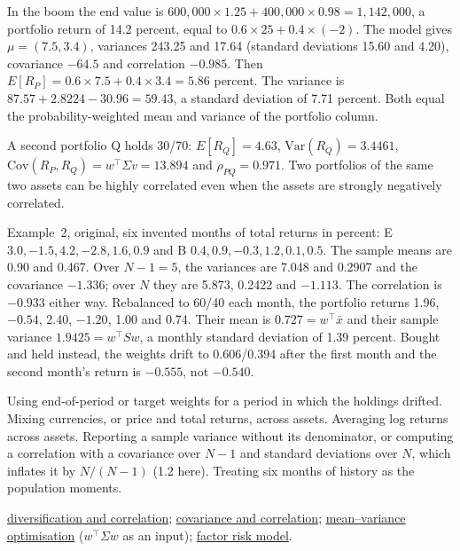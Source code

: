 \begin{qfmethod}
In the boom the end value is $600{,}000\times1.25+400{,}000\times0.98=1{,}142{,}000$, a portfolio return of 14.2 percent, equal to $0.6\times25+0.4\times(-2)$. The model gives $\mu=(7.5,3.4)$, variances 243.25 and 17.64 (standard deviations 15.60 and 4.20), covariance $-64.5$ and correlation $-0.985$. Then $E[R_P]=0.6\times7.5+0.4\times3.4=5.86$ percent. The variance is $87.57+2.8224-30.96=59.43$, a standard deviation of 7.71 percent. Both equal the probability-weighted mean and variance of the portfolio column.

A second portfolio Q holds 30/70: $E[R_Q]=4.63$, $\mathrm{Var}(R_Q)=3.4461$, $\mathrm{Cov}(R_P,R_Q)=w^\top\Sigma v=13.894$ and $\rho_{PQ}=0.971$. Two portfolios of the same two assets can be highly correlated even when the assets are strongly negatively correlated.

Example~2, original, six invented months of total returns in percent: E $3.0,-1.5,4.2,-2.8,1.6,0.9$ and B $0.4,0.9,-0.3,1.2,0.1,0.5$. The sample means are 0.90 and 0.467. Over $N-1=5$, the variances are 7.048 and 0.2907 and the covariance $-1.336$; over $N$ they are 5.873, 0.2422 and $-1.113$. The correlation is $-0.933$ either way. Rebalanced to 60/40 each month, the portfolio returns 1.96, $-0.54$, 2.40, $-1.20$, 1.00 and 0.74. Their mean is $0.727=w^\top\bar x$ and their sample variance $1.9425=w^\top Sw$, a monthly standard deviation of 1.39 percent. Bought and held instead, the weights drift to 0.606/0.394 after the first month and the second month's return is $-0.555$, not $-0.540$.

 Using end-of-period or target weights for a period in which the holdings drifted. Mixing currencies, or price and total returns, across assets. Averaging log returns across assets. Reporting a sample variance without its denominator, or computing a correlation with a covariance over $N-1$ and standard deviations over $N$, which inflates it by $N/(N-1)$ (1.2 here). Treating six months of history as the population moments.

 \hyperref[mech:diversification-correlation]{diversification and correlation}; \hyperref[def:return-dependence]{covariance and correlation}; \hyperref[mod:mean-variance-portfolio-optimisation]{mean--variance optimisation} ($w^\top\Sigma w$ as an input); \hyperref[mod:factor-risk-model]{factor risk model}.

\end{qfmethod}

